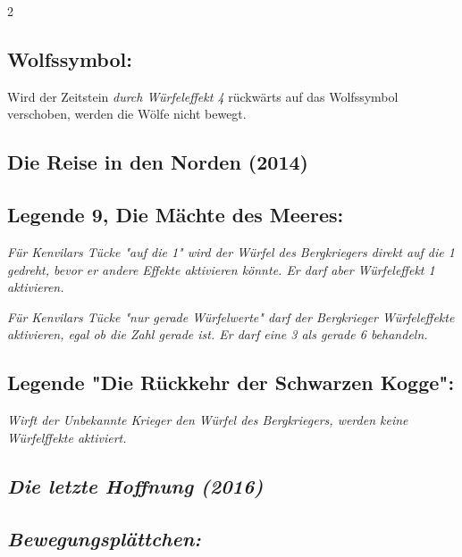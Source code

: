 \documentclass[10pt, a4paper, oneside]{book}
\newcommand{\fan}[1]{\textit{#1}}
\begin{document}
\begin{multicols*}{2}
\begin{bgcolor}
\subsection{Wolfssymbol:}

Wird der Zeitstein \fan{durch Würfeleffekt 4} rückwärts auf das Wolfssymbol verschoben, werden die Wölfe nicht bewegt.
\supercite{StSch:Begleitheft}

\end{bgcolor}





\columnbreak


\begin{bgcolor}
\section{Die Reise in den Norden (2014)}

\subsection{Legende 9, Die Mächte des Meeres:}

\fan{Für Kenvilars Tücke "auf die 1" wird der Würfel des Bergkriegers direkt auf die 1 gedreht, bevor er andere Effekte aktivieren könnte. Er darf aber Würfeleffekt 1 aktivieren.}

\fan{Für Kenvilars Tücke "nur gerade Würfelwerte" darf der Bergkrieger Würfeleffekte aktivieren, egal ob die Zahl gerade ist. Er darf eine 3 als gerade 6 behandeln.}


\subsection{Legende "Die Rückkehr der Schwarzen Kogge":}

\fan{Wirft der Unbekannte Krieger den Würfel des Bergkriegers, werden keine Würfelffekte aktiviert.}

\end{bgcolor}


\begin{bgcolor}
\section{\fan{Die letzte Hoffnung (2016)}}

\subsection{\fan{Bewegungsplättchen:}}


\end{bgcolor}
\end{multicols*}
\end{document}
